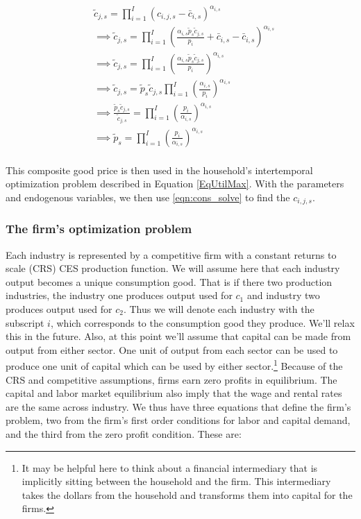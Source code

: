 \documentclass[letterpaper,12pt]{article}
\theoremstyle{definition}
\begin{document}
\begin{spacing}{1.5}
              \begin{equation} \label{eqn:composite_price}
      \begin{split}
      & \tilde{c}_{j,s} = \prod_{i=1}^{I}(c_{i,j,s}-\bar{c}_{i,s})^{\alpha_{i,s}} \\
      &\implies \tilde{c}_{j,s} = \prod_{i=1}^{I}\left( \frac{\alpha_{i,s} \tilde{p}_{s}\tilde{c}_{j,s}}{p_{i}} + \bar{c}_{i,s}-\bar{c}_{i,s}\right)^{\alpha_{i,s}} \\
      &\implies \tilde{c}_{j,s} = \prod_{i=1}^{I} \left( \frac{\alpha_{i,s} \tilde{p}_{s}\tilde{c}_{j,s}}{p_{i}} \right)^{\alpha_{i,s}} \\
      &\implies \tilde{c}_{j,s} =  \tilde{p}_{s}\tilde{c}_{j,s} \prod_{i=1}^{I}\left( \frac{\alpha_{i,s}}{p_{i}} \right)^{\alpha_{i,s}} \\
      &\implies \frac{\tilde{p}_{s}\tilde{c}_{j,s}}{\tilde{c}_{j,s}} =  \prod_{i=1}^{I}\left( \frac{p_{i}}{\alpha_{i,s}} \right)^{\alpha_{i,s}} \\
       &\implies \tilde{p}_{s} =  \prod_{i=1}^{I}\left( \frac{p_{i}}{\alpha_{i,s}} \right)^{\alpha_{i,s}} \\
       \end{split}
    \end{equation}
    
    This composite good price is then used in the household's intertemporal optimization problem described in Equation \ref{EqUtilMax}.  With the parameters and endogenous variables, we then use \ref{eqn:cons_solve} to find the $c_{i,j,s}$.
 
\subsubsection*{The firm's optimization problem} 

Each industry is represented by a competitive firm with a constant returns to scale (CRS) CES production function.  We will assume here that each industry output becomes a unique consumption good.  That is if there two production industries, the industry one produces output used for $c_{1}$ and industry two produces output used for $c_{2}$.  Thus we will denote each industry with the subscript $i$, which corresponds to the consumption good they produce.  We'll relax this in the future.  Also, at this point we'll assume that capital can be made from output from either sector.  One unit of output from each sector can be used to produce one unit of capital which can be used by either sector.\footnote{It may be helpful here to think about a financial intermediary that is implicitly sitting between the household and the firm.  This intermediary takes the dollars from the household and transforms them into capital for the firms.}  Because of the CRS and competitive assumptions, firms earn zero profits in equilibrium.  The capital and labor market equilibrium also imply that the wage and rental rates are the same across industry.  We thus have three equations that define the firm's problem, two from the firm's first order conditions for labor and capital demand, and the third from the zero profit condition.  These are:


\end{spacing}
\end{document}
